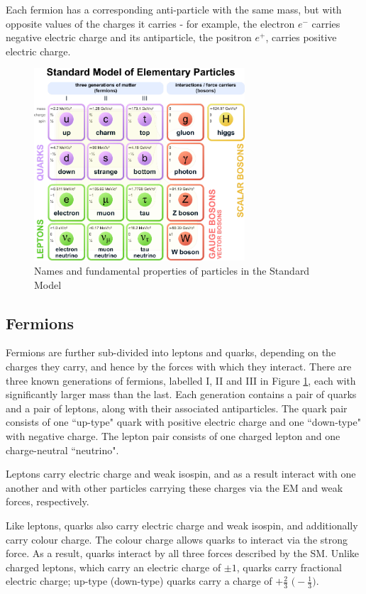 Each fermion has a corresponding anti-particle with the same mass, but with opposite values of the charges it carries - for example, the electron \(e^-\) carries negative electric charge and its antiparticle, the positron \(e^+\), carries positive electric charge. 

\begin{figure}[H]
	\centering
	\includegraphics[width=0.7\textwidth]{Figures/1/StandardModel.pdf}
	\caption[]{Names and fundamental properties of particles in the Standard Model}
	\label{fig:standard_model}
\end{figure}

\subsection{Fermions}
\label{sec:fermions}

Fermions are further sub-divided into leptons and quarks, depending on the charges they carry, and hence by the forces with which they interact. There are three known generations of fermions, labelled I, II and III in Figure \ref{fig:standard_model}, each with significantly larger mass than the last. Each generation contains a pair of quarks and a pair of leptons, along with their associated antiparticles. The quark pair consists of one ``up-type" quark with positive electric charge and one ``down-type" with negative charge. The lepton pair consists of one charged lepton and one charge-neutral ``neutrino". 

Leptons carry electric charge and weak isospin, and as a result interact with one another and with other particles carrying these charges via the EM and weak forces, respectively.  

Like leptons, quarks also carry electric charge and weak isospin, and additionally carry colour charge. The colour charge allows quarks to interact via the strong force. As a result, quarks interact by all three forces described by the SM. Unlike charged leptons, which carry an electric charge of \(\pm1\), quarks carry fractional electric charge; up-type (down-type) quarks carry a charge of \(+\frac{2}{3}\) \(\big(-\frac{1}{3}\big)\).

